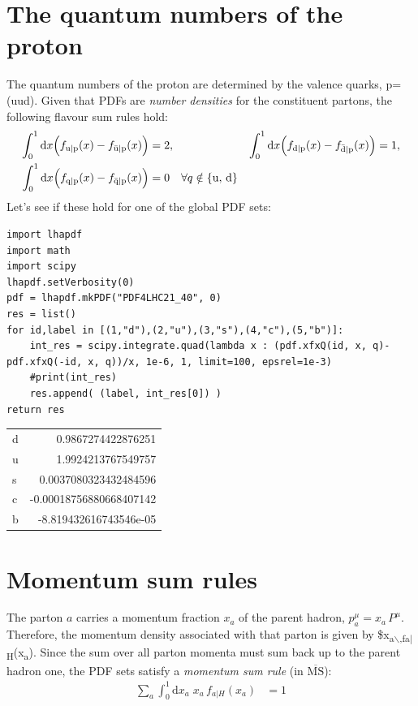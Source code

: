 \documentclass[11pt]{article}
\begin{document}
\section{The quantum numbers of the proton}
\label{sec:org1a67141}
The quantum numbers of the proton are determined by the valence quarks, p=(uud).
Given that PDFs are \emph{number densities} for the constituent partons, the following flavour sum rules hold:
\begin{align}
  \int_0^1\mathrm{d}x \Bigl(
    f_{\mathrm{u}\vert\mathrm{p}}(x)
  - f_{\bar{\mathrm{u}}\vert\mathrm{p}}(x)
  \Bigr)
  &= 2, &
  \int_0^1\mathrm{d}x \Bigl(
    f_{\mathrm{d}\vert\mathrm{p}}(x)
  - f_{\bar{\mathrm{d}}\vert\mathrm{p}}(x)
  \Bigr)
  &= 1,
  \\
  \int_0^1\mathrm{d}x \Bigl(
    f_{\mathrm{q}\vert\mathrm{p}}(x)
  - f_{\bar{\mathrm{q}}\vert\mathrm{p}}(x)
  \Bigr)
  &= 0 \quad \forall q \notin \{\mathrm{u},\,\mathrm{d}\}
\end{align}
Let's see if these hold for one of the global PDF sets:
\begin{verbatim}
import lhapdf
import math
import scipy
lhapdf.setVerbosity(0)
pdf = lhapdf.mkPDF("PDF4LHC21_40", 0)
res = list()
for id,label in [(1,"d"),(2,"u"),(3,"s"),(4,"c"),(5,"b")]:
    int_res = scipy.integrate.quad(lambda x : (pdf.xfxQ(id, x, q)-pdf.xfxQ(-id, x, q))/x, 1e-6, 1, limit=100, epsrel=1e-3)
    #print(int_res)
    res.append( (label, int_res[0]) )
return res
\end{verbatim}

\begin{center}
\begin{tabular}{lr}
d & 0.9867274422876251\\[0pt]
u & 1.9924213767549757\\[0pt]
s & 0.0037080323432484596\\[0pt]
c & -0.00018756880668407142\\[0pt]
b & -8.819432616743546e-05\\[0pt]
\end{tabular}
\end{center}

\section{Momentum sum rules}
\label{sec:orgdc9cf80}
The parton \(a\) carries a momentum fraction \(x_a\) of the parent hadron, \(p_a^\mu=x_a\,P^\mu\).
Therefore, the momentum density associated with that parton is given by \$x\textsubscript{a$\backslash$,f}\textsubscript{a\(\vert{}\) H}(x\textsubscript{a}).
Since the sum over all parton momenta must sum back up to the parent hadron one, the PDF sets satisfy a \emph{momentum sum rule} (in \(\overline{\text{MS}}\)):
\begin{align}
  \sum_a \int_0^1 \mathrm{d}x_a \; x_a\,f_{a\vert H}(x_a)
  &= 1
\end{align}
\end{document}
